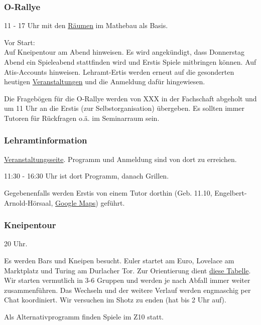 \documentclass[10pt,ngerman]{scrartcl}
\begin{document}
\begin{multicols}{2}
\subsubsection{O-Rallye}

11 - 17 Uhr mit den \hyperref[rooms]{Räumen} im Mathebau als Basis.

Vor Start: \\
Auf Kneipentour am Abend hinweisen.
Es wird angekündigt, dass Donnerstag Abend ein Spieleabend stattfinden wird und Erstis Spiele mitbringen können.
Auf Atis-Accounts hinweisen.
Lehramt-Ertis werden erneut auf die gesonderten heutigen \hyperref[lehramt]{Veranstaltungen} und die Anmeldung dafür hingewiesen.

Die Fragebögen für die O-Rallye werden von XXX in der Fachschaft
abgeholt und um 11 Uhr an die Erstis (zur Selbstorganisation) übergeben.
Es sollten immer Tutoren für Rückfragen o.ä. im Seminarraum sein.

\subsubsection{Lehramtinformation}\label{lehramt}

\href{https://www.hoc.kit.edu/zlb/Veranstaltungskalender.php/event/46988?}{Veranstaltungsseite}.
Programm und Anmeldung sind von dort zu erreichen.

11:30 - 16:30 Uhr ist dort Programm, danach Grillen.

Gegebenenfalls werden Erstis von einem Tutor dorthin (Geb. 11.10, Engelbert-Arnold-Hörsaal, \href{https://goo.gl/maps/R9WbmtbrKRxdziYY9}{Google Maps}) geführt.


\subsubsection{Kneipentour}

20 Uhr.

Es werden Bars und Kneipen besucht.
Euler startet am Euro, Lovelace am Marktplatz und Turing am Durlacher Tor.
Zur Orientierung dient \href{https://docs.google.com/spreadsheets/d/1Ea5M858ijKzbtYuySIMmbNUEUUtv-4jGpAmmq59vIvc/edit?usp=sharing}{diese Tabelle}.
Wir starten vermutlich in 3-6 Gruppen und werden je nach Abfall immer weiter zusammenführen.
Das Wechseln und der weitere Verlauf werden engmaschig per Chat koordiniert.
Wir versuchen im Shotz zu enden (hat bis 2 Uhr auf).

Als Alternativprogramm finden Spiele im Z10 statt.




\end{multicols}
\end{document}
